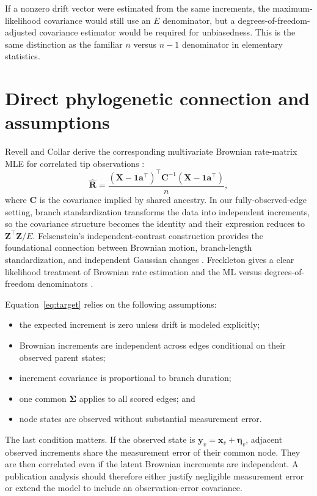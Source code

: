 \documentclass[10pt]{article}
\begin{document}
If a nonzero drift vector were estimated from the same increments, the
maximum-likelihood covariance would still use an $E$ denominator, but a
degrees-of-freedom-adjusted covariance estimator would be required for
unbiasedness.  This is the same distinction as the familiar $n$ versus $n-1$
denominator in elementary statistics.

\section{Direct phylogenetic connection and assumptions}

Revell and Collar derive the corresponding multivariate Brownian rate-matrix
MLE for correlated tip observations \cite{revellcollar2009}:
\[
  \widehat{\mathbf R}
  =\frac{(\mathbf X-\mathbf1\mathbf a^\top)^\top
          \mathbf C^{-1}
         (\mathbf X-\mathbf1\mathbf a^\top)}{n},
\]
where $\mathbf C$ is the covariance implied by shared ancestry.  In our
fully-observed-edge setting, branch standardization transforms the data into
independent increments, so the covariance structure becomes the identity and
their expression reduces to $\mathbf Z^\top\mathbf Z/E$.  Felsenstein's
independent-contrast construction provides the foundational connection between
Brownian motion, branch-length standardization, and independent Gaussian
changes \cite{felsenstein1985}.  Freckleton gives a clear likelihood treatment
of Brownian rate estimation and the ML versus degrees-of-freedom denominators
\cite{freckleton2012}.

Equation~\eqref{eq:target} relies on the following assumptions:

\begin{itemize}
  \item the expected increment is zero unless drift is modeled explicitly;
  \item Brownian increments are independent across edges conditional on their
        observed parent states;
  \item increment covariance is proportional to branch duration;
  \item one common $\boldsymbol\Sigma$ applies to all scored edges; and
  \item node states are observed without substantial measurement error.
\end{itemize}

The last condition matters.  If the observed state is
$\mathbf y_v=\mathbf x_v+\boldsymbol\eta_v$, adjacent observed increments share
the measurement error of their common node.  They are then correlated even if
the latent Brownian increments are independent.  A publication analysis should
therefore either justify negligible measurement error or extend the model to
include an observation-error covariance.
\end{document}
